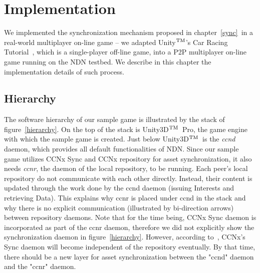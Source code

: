 \chapter{Implementation}
\label{implementation}
\def\tm{\leavevmode\hbox{$\rm {}^{TM}$}} %

We implemented the synchronization mechanism proposed in chapter~\ref{sync}~in a real-world multiplayer on-line game -- we adapted Unity\tm's Car Racing Tutorial~\cite{UnityCar}, which is a single-player off-line game, into a P2P multiplayer on-line game running on the NDN testbed. We describe in this chapter the implementation details of such process. 



\section{Hierarchy}

The software hierarchy of our sample game is illustrated by the stack of figure~\ref{hierarchy}. On the top of the stack is Unity3D\tm~Pro, the game engine with which the sample game is created. Just below Unity3D\tm~is the \emph{ccnd} daemon, which provides all default functionalities of NDN. Since our sample game utilizes CCNx Sync and CCNx repository for asset synchronization, it also needs \emph{ccnr}, the daemon of the local repository, to be running. Each peer's local repository do not communicate with each other directly. Instead, their content is updated through the work done by the ccnd daemon (issuing Interests and retrieving Data). This explains why ccnr is placed under ccnd in the stack and why there is no explicit communication (illustrated by bi-direction arrows) between repository daemons. Note that for the time being, CCNx Sync daemon is incorporated as part of the ccnr daemon, therefore we did not explicitly show the synchronization daemon in figure~\ref{hierarchy}. However, according to~\cite{CCNxSync}, CCNx's Sync daemon will become independent of the repository eventually. By that time, there should be a new layer for asset synchronization between the "ccnd" daemon and the "ccnr" daemon.

